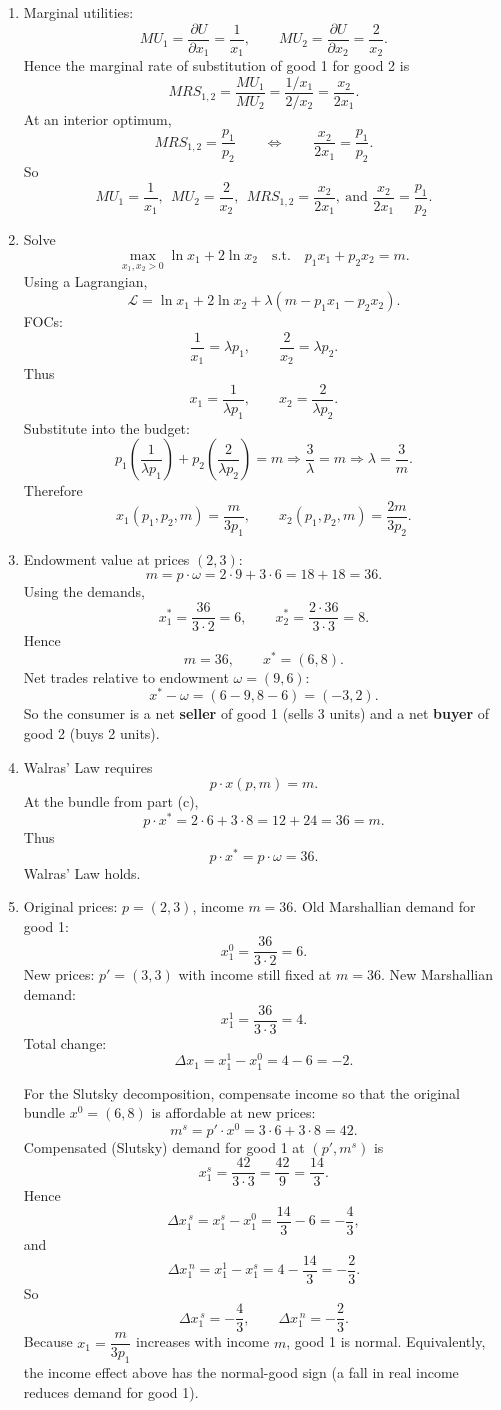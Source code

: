 \documentclass[12pt]{article}
\begin{document}
\begin{enumerate}[label=(\alph*)]
\item Marginal utilities:
\[
MU_1=\frac{\partial U}{\partial x_1}=\frac{1}{x_1},
\qquad
MU_2=\frac{\partial U}{\partial x_2}=\frac{2}{x_2}.
\]
Hence the marginal rate of substitution of good 1 for good 2 is
\[
MRS_{1,2}=\frac{MU_1}{MU_2} = \frac{1/x_1}{2/x_2}=\frac{x_2}{2x_1}.
\]
At an interior optimum,
\[
MRS_{1,2}=\frac{p_1}{p_2}
\qquad\Longleftrightarrow\qquad
\frac{x_2}{2x_1}=\frac{p_1}{p_2}.
\]
So
\[
\boxed{MU_1=\frac1{x_1},\ \ MU_2=\frac2{x_2},\ \ MRS_{1,2}=\frac{x_2}{2x_1},\ \text{and } \frac{x_2}{2x_1}=\frac{p_1}{p_2}.}
\]

\item Solve
\[
\max_{x_1,x_2>0} \ln x_1+2\ln x_2
\quad\text{s.t.}\quad p_1x_1+p_2x_2=m.
\]
Using a Lagrangian,
\[
\mathcal L=\ln x_1+2\ln x_2+\lambda(m-p_1x_1-p_2x_2).
\]
FOCs:
\[
\frac1{x_1}=\lambda p_1,
\qquad
\frac2{x_2}=\lambda p_2.
\]
Thus
\[
x_1=\frac{1}{\lambda p_1},
\qquad
x_2=\frac{2}{\lambda p_2}.
\]
Substitute into the budget:
\[
p_1\left(\frac{1}{\lambda p_1}\right)+p_2\left(\frac{2}{\lambda p_2}\right)=m
\Rightarrow \frac{3}{\lambda}=m
\Rightarrow \lambda=\frac{3}{m}.
\]
Therefore
\[
\boxed{x_1(p_1,p_2,m)=\frac{m}{3p_1},\qquad x_2(p_1,p_2,m)=\frac{2m}{3p_2}.}
\]

\item Endowment value at prices $(2,3)$:
\[
m=p\cdot\omega = 2\cdot 9 + 3\cdot 6 = 18+18=36.
\]
Using the demands,
\[
x_1^*=\frac{36}{3\cdot 2}=6,
\qquad
x_2^*=\frac{2\cdot 36}{3\cdot 3}=8.
\]
Hence
\[
\boxed{m=36,\qquad x^*=(6,8).}
\]
Net trades relative to endowment $\omega=(9,6)$:
\[
x^*-\omega = (6-9,8-6)=(-3,2).
\]
So the consumer is a net \textbf{seller} of good 1 (sells 3 units) and a net \textbf{buyer} of good 2 (buys 2 units).

\item Walras' Law requires
\[
p\cdot x(p,m)=m.
\]
At the bundle from part (c),
\[
p\cdot x^*=2\cdot 6 + 3\cdot 8 = 12+24=36 = m.
\]
Thus
\[
\boxed{p\cdot x^*=p\cdot\omega=36.}
\]
Walras' Law holds.

\item Original prices: $p=(2,3)$, income $m=36$.
Old Marshallian demand for good 1:
\[
x_1^0=\frac{36}{3\cdot 2}=6.
\]
New prices: $p'=(3,3)$ with income still fixed at $m=36$.
New Marshallian demand:
\[
x_1^1=\frac{36}{3\cdot 3}=4.
\]
Total change:
\[
\Delta x_1 = x_1^1-x_1^0 = 4-6=-2.
\]

\medskip
\noindent
For the Slutsky decomposition, compensate income so that the original bundle $x^0=(6,8)$ is affordable at new prices:
\[
m^s = p'\cdot x^0 = 3\cdot 6 + 3\cdot 8 = 42.
\]
Compensated (Slutsky) demand for good 1 at $(p',m^s)$ is
\[
x_1^s = \frac{42}{3\cdot 3}=\frac{42}{9}=\frac{14}{3}.
\]
Hence
\[
\Delta x_1^{\,s}=x_1^s-x_1^0 = \frac{14}{3}-6 = -\frac{4}{3},
\]
and
\[
\Delta x_1^{\,n}=x_1^1-x_1^s = 4-\frac{14}{3}= -\frac{2}{3}.
\]
So
\[
\boxed{\Delta x_1^{\,s}=-\frac{4}{3},\qquad \Delta x_1^{\,n}=-\frac{2}{3}.}
\]
Because $x_1=\dfrac{m}{3p_1}$ increases with income $m$, good 1 is normal. Equivalently, the income effect above has the normal-good sign (a fall in real income reduces demand for good 1).
\end{enumerate}
\end{document}
